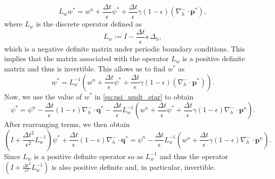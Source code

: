 \documentclass[11pt]{article}
\numberwithin{equation}{section}
\newtheorem{counter example}[theorem]{Counter Example}
\numberwithin{equation}{section}
\numberwithin{equation}{section}
\begin{document}
\[
L_w w^*
=
w^n + \frac{\Delta t}{\epsilon}\psi^*
+ \frac{\Delta t}{\epsilon}\gamma(1-\epsilon)(\nabla_h^- \cdot \mathbf{p}^{*}),
\]
where $L_w$ is the discrete operator defined as
\[
L_w := I - \frac{\Delta t}{\epsilon}s\,\Delta_h,
\]
which is a negative definite matrix under periodic boundary conditions. This implies that the matrix associated with the operator $L_w$ is a positive definite matrix and thus is invertible. This allows us to find $w^*$ as 
\begin{equation}
\label{eq:wstar_recovery}
w^*
=
L_w^{-1}
\left(
w^n + \frac{\Delta t}{\epsilon}\psi^*
+ \frac{\Delta t}{\epsilon}\gamma(1-\epsilon)(\nabla_h^- \cdot \mathbf{p}^{*})
\right).
\end{equation}
Now, we use the value of $w^*$ in \eqref{eq:psi_updt_star} to obtain 
\[
\psi^*
=
\psi^n
-
\frac{\Delta t}{\epsilon}(1-\epsilon)\nabla_h^- \cdot \mathbf{q}^*
-
\frac{\Delta t}{\epsilon}
L_w^{-1}
\left(
w^n + \frac{\Delta t}{\epsilon}\psi^*
+ \frac{\Delta t}{\epsilon}\gamma(1-\epsilon)\nabla_h^- \cdot \mathbf{p}^n
\right).
\]
After rearranging terms, we then obtain
\[
\left(
I + \frac{\Delta t^2}{\epsilon^2}L_w^{-1}
\right)\psi^*
+
\frac{\Delta t}{\epsilon}(1-\epsilon)\nabla_h^- \cdot \mathbf{q}^*
=
\psi^n
-
\frac{\Delta t}{\epsilon}
L_w^{-1}
\left(
w^n + \frac{\Delta t}{\epsilon}\gamma(1-\epsilon)\nabla_h^- \cdot \mathbf{p}^n
\right).
\]
Since $L_w$ is a positive definite operator so as $L_w^{-1}$ and thus the operator $\left(
I + \frac{\Delta t^2}{\epsilon^2}L_w^{-1}
\right)$ is also positive definite and, in particular, invertible. 
\end{document}
